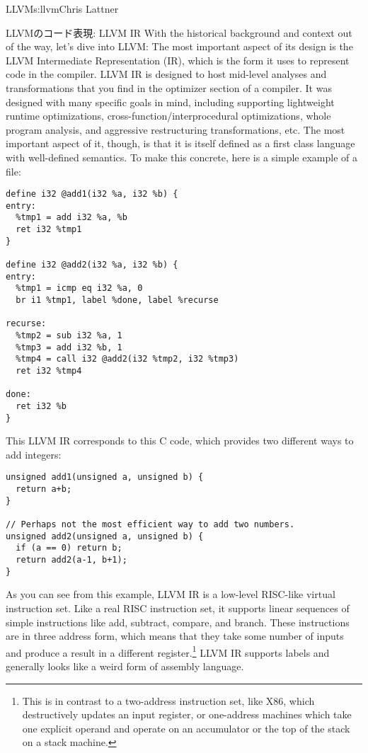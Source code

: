 \begin{aosachapter}{LLVM}{s:llvm}{Chris Lattner}
\begin{aosasect1}{LLVMのコード表現: LLVM IR}
With the historical background and context out of the way, let's dive
into LLVM: The most important aspect of its design is the LLVM
Intermediate Representation (IR), which is the form it uses to
represent code in the compiler.  LLVM IR is designed to host mid-level
analyses and transformations that you find in the optimizer section of
a compiler.  It was designed with many specific goals in mind,
including supporting lightweight runtime optimizations,
cross-function/interprocedural optimizations, whole program analysis,
and aggressive restructuring transformations, etc.  The most important
aspect of it, though, is that it is itself defined as a first class
language with well-defined semantics. To make this concrete, here is a
simple example of a  file:

\begin{verbatim}
define i32 @add1(i32 %a, i32 %b) {
entry:
  %tmp1 = add i32 %a, %b
  ret i32 %tmp1
}

define i32 @add2(i32 %a, i32 %b) {
entry:
  %tmp1 = icmp eq i32 %a, 0
  br i1 %tmp1, label %done, label %recurse

recurse:
  %tmp2 = sub i32 %a, 1
  %tmp3 = add i32 %b, 1
  %tmp4 = call i32 @add2(i32 %tmp2, i32 %tmp3)
  ret i32 %tmp4

done:
  ret i32 %b
}
\end{verbatim}

\noindent This LLVM IR corresponds to this C code, which provides two different
ways to add integers:

\begin{verbatim}
unsigned add1(unsigned a, unsigned b) {
  return a+b;
}

// Perhaps not the most efficient way to add two numbers.
unsigned add2(unsigned a, unsigned b) {
  if (a == 0) return b;
  return add2(a-1, b+1);
}
\end{verbatim}

\noindent As you can see from this example, LLVM IR is a low-level RISC-like
virtual instruction set.  Like a real RISC instruction set, it
supports linear sequences of simple instructions like add, subtract,
compare, and branch.  These instructions are in three address form,
which means that they take some number of inputs and produce a result
in a different register.\footnote{This is in contrast to a two-address
instruction set, like X86, which destructively updates an input
register, or one-address machines which take one explicit operand
and operate on an accumulator or the top of the stack on a stack
machine.} LLVM IR supports labels and generally looks like a weird
form of assembly language.


\end{aosasect1}
\end{aosachapter}
